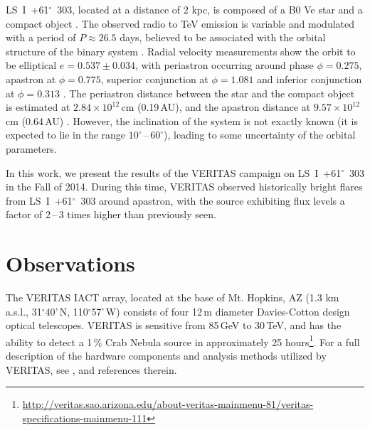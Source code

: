 \documentclass[preprint2]{aastex}
\newcommand{\tapp}{\raisebox{0.5ex}{\texttildelow}}
\newcommand{\lsi}{LS~I~+61$^{\circ}$~303}
\newcommand{\gev}{\,GeV}
\newcommand{\tev}{\,TeV}
\begin{document}
\lsi{}, located at a distance of \tapp{}$2$ kpc, is composed of a B0 Ve star and a compact object \citep{HandC1981, Casares2005}. The observed radio to TeV emission is variable and modulated with a period of $P \approx 26.5$ days, believed to be associated with the orbital structure of the binary system \citep{Albert2006, Esposito2007, VERITASLSIDetection, Abdo2009, LiXray, 2015A&A...575L...9M}. Radial velocity measurements show the orbit to be elliptical $e = 0.537\pm0.034$, with periastron occurring around phase $\phi=0.275$, apastron at $\phi=0.775$, superior conjunction at $\phi=1.081$ and inferior conjunction at $\phi=0.313$ \citep{Aragona2009}. The periastron distance between the star and the compact object is estimated at $2.84 \times 10^{12}$\,cm (0.19\,AU), and the apastron distance at $9.57 \times 10^{12}$\,cm (0.64\,AU) \citep{2013A&ARv..21...64D}. However, the inclination of the system is not exactly known (it is expected to lie in the range $10^\circ$\,--\,$60^\circ$), leading to some uncertainty of the orbital parameters.


In this work, we present the results of the VERITAS campaign on \lsi{} in the Fall of 2014. During this time, VERITAS observed historically bright flares from \lsi{} around apastron, with the source exhibiting flux levels a factor of 2\,--\,3 times higher than previously seen.

\section{Observations}
The VERITAS IACT array, located at the base of Mt. Hopkins, AZ (1.3 km a.s.l., 31$^{\circ}$40'\,N, 110$^{\circ}$57'\,W) consists of four 12\,m diameter Davies-Cotton design optical telescopes. VERITAS is sensitive from 85\gev{} to 30\tev{}, and has the ability to detect a 1\,\% Crab Nebula source in approximately 25 hours\footnote{\url{http://veritas.sao.arizona.edu/about-veritas-mainmenu-81/veritas-specifications-mainmenu-111}}. For a full description of the hardware components and analysis methods utilized by VERITAS, see \citet{VERITAS, KiedaVTSUpgrade, VERITASLSIDetection}, and references therein.
\end{document}
